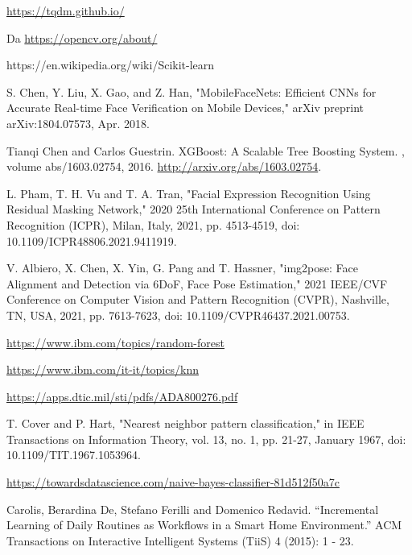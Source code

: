 \begin{thebibliography}{9}
     \url{https://tqdm.github.io/}
    
     Da \url{https://opencv.org/about/}
    
     {https://en.wikipedia.org/wiki/Scikit-learn}
    
     S. Chen, Y. Liu, X. Gao, and Z. Han, "MobileFaceNets: Efficient CNNs for Accurate Real-time Face Verification on Mobile Devices," arXiv preprint arXiv:1804.07573, Apr. 2018.
    
    Tianqi Chen and Carlos Guestrin.
    \newblock XGBoost: {A} Scalable Tree Boosting System.
    , volume abs/1603.02754, 2016.
    \newblock \url{http://arxiv.org/abs/1603.02754}.
    
    L. Pham, T. H. Vu and T. A. Tran, "Facial Expression Recognition Using Residual Masking Network," 2020 25th International Conference on Pattern Recognition (ICPR), Milan, Italy, 2021, pp. 4513-4519, doi: 10.1109/ICPR48806.2021.9411919.
    
    V. Albiero, X. Chen, X. Yin, G. Pang and T. Hassner, "img2pose: Face Alignment and Detection via 6DoF, Face Pose Estimation," 2021 IEEE/CVF Conference on Computer Vision and Pattern Recognition (CVPR), Nashville, TN, USA, 2021, pp. 7613-7623, doi: 10.1109/CVPR46437.2021.00753.
    
     \url{https://www.ibm.com/topics/random-forest}
    
     \url{https://www.ibm.com/it-it/topics/knn}
    
     \url{https://apps.dtic.mil/sti/pdfs/ADA800276.pdf}
    
    T. Cover and P. Hart, "Nearest neighbor pattern classification," in IEEE Transactions on Information Theory, vol. 13, no. 1, pp. 21-27, January 1967, doi: 10.1109/TIT.1967.1053964.
    
     \url{https://towardsdatascience.com/naive-bayes-classifier-81d512f50a7c}

     Carolis, Berardina De, Stefano Ferilli and Domenico Redavid. “Incremental Learning of Daily Routines as Workflows in a Smart Home Environment.” ACM Transactions on Interactive Intelligent Systems (TiiS) 4 (2015): 1 - 23.


\end{thebibliography}

